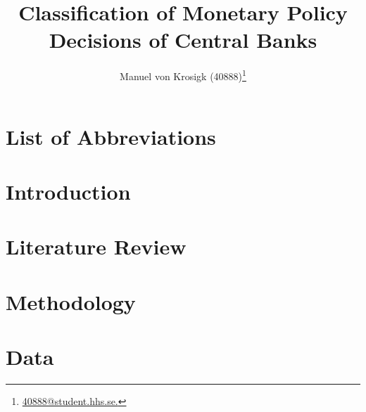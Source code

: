 \documentclass[%
a4paper, 12pt, DIV=calc, BCOR5mm,abstracton]{scrartcl}
\title{Classification of Monetary Policy Decisions of Central Banks}
\author{Manuel von Krosigk (40888)\footnote{\href{mailto:40888@student.hhs.se.}{40888@student.hhs.se.}}}
\newcounter{SeitenzahlSpeicher}
\begin{document}

\thispagestyle{empty}

\newpage

	
\renewcommand{\baselinestretch}{1.08}\normalsize %
\tableofcontents
\renewcommand{\baselinestretch}{1.0}\onehalfspacing
%
\clearpage
\section*{List of Abbreviations} 

\listoffigures  {} 
\listoftables {}


\clearpage
\setcounter{SeitenzahlSpeicher}{\value{page}}



\section{Introduction} \label{sec:Intro}


\section{Literature Review} \label{sec:Lit}


\section{Methodology} \label{sec:Meth}


\section{Data} \label{sec:Data}

\end{document}
